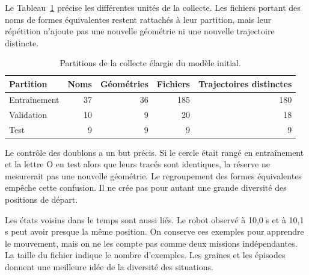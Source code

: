 Le Tableau~\ref{tab:partitions} précise les différentes unités de la collecte. Les fichiers portant des noms de formes équivalentes restent rattachés à leur partition, mais leur répétition n'ajoute pas une nouvelle géométrie ni une nouvelle trajectoire distincte.
\begin{table}[htbp]
\caption{Partitions de la collecte élargie du modèle initial.}
\label{tab:partitions}


\centering
\begin{tabular}{lrrrr}
\toprule
Partition & Noms & Géométries & Fichiers & Trajectoires distinctes\\\midrule
Entraînement & 37 & 36 & 185 & 180\\
Validation & 10 & 9 & 20 & 18\\
Test & 9 & 9 & 9 & 9\\\bottomrule
\end{tabular}
\end{table}

Le contrôle des doublons a un but précis. Si le cercle était rangé en entraînement et la lettre O en test alors que leurs tracés sont identiques, la réserve ne mesurerait pas une nouvelle géométrie. Le regroupement des formes équivalentes empêche cette confusion. Il ne crée pas pour autant une grande diversité des positions de départ.

Les états voisins dans le temps sont aussi liés. Le robot observé à 10,0 s et à 10,1 s peut avoir presque la même position. On conserve ces exemples pour apprendre le mouvement, mais on ne les compte pas comme deux missions indépendantes. La taille du fichier indique le nombre d'exemples. Les graines et les épisodes donnent une meilleure idée de la diversité des situations.


